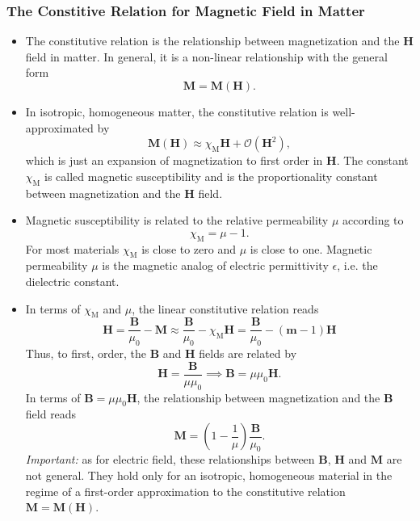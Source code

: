 \documentclass[11pt, a4paper]{article}
\renewcommand{\vec}[1]{\bm{#1}} %
\newcommand{\B}{\vec{B}} %
\renewcommand{\H}{\vec{H}}  %
\newcommand{\M}{\vec{M}}  %
\newcommand{\mm}{\mu_{0}}  %
\newcommand{\m}{\vec{m}}  %
\begin{document}
\subsubsection{The Constitive Relation for Magnetic Field in Matter} \label{sss:const-rel-magnetic}
\begin{itemize}

    \item The constitutive relation is the relationship between magnetization and the $ \H $ field in matter. In general, it is a non-linear relationship with the general form
	\begin{equation*}
		\M = \M(\H).
	\end{equation*}


    \item In isotropic, homogeneous matter, the constitutive relation is well-approximated by
	\begin{equation*}
		\M(\H) \approx \chi_{\text{M}} \H + \mathcal{O}(\H^{2}),
	\end{equation*}
    which is just an expansion of magnetization to first order in $ \H $. The constant $ \chi_{\text{M}} $ is called magnetic susceptibility and is the proportionality constant between magnetization and the $ \H $ field.

    \item Magnetic susceptibility is related to the relative permeability $ \mu $ according to
	\begin{equation*}
        \chi_{\text{M}} = \mu - 1.
	\end{equation*}
    For most materials $ \chi_{\text{M}} $ is close to zero and $ \mu $ is close to one. Magnetic permeability $ \mu $ is the magnetic analog of electric permittivity $ \epsilon $, i.e. the dielectric constant.
	
	\item In terms of $ \chi_{\text{M}} $ and $ \mu $, the linear constitutive relation reads
	\begin{equation*}
        \H = \frac{\B}{\mm} - \M \approx \frac{\B}{\mm} - \chi_{\text{M}} \H = \frac{\B}{\mm} - (\m - 1)\H
	\end{equation*}
    Thus, to first, order, the $ \B $ and $ \H $ fields are related by
	\begin{equation*}
        \H = \frac{\B}{\mu \mm} \implies \B = \mu \mm \H.
	\end{equation*}
    In terms of $ \B = \mu \mm \H $, the relationship between magnetization and the $ \B $ field reads
	\begin{equation*}
        \M = \left( 1 - \frac{1}{\mu} \right)\frac{\B}{\mm}.
	\end{equation*}
    \textit{Important:} as for electric field, these relationships between $ \B $, $ \H $ and $ \M $ are not general. They hold only for an isotropic, homogeneous material in the regime of a first-order approximation to the constitutive relation $ \M = \M(\H) $.

\end{itemize}
\end{document}
